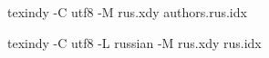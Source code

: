  
 
 
 
 
texindy -C utf8 -M rus.xdy authors.rus.idx

texindy -C utf8 -L russian -M rus.xdy rus.idx

